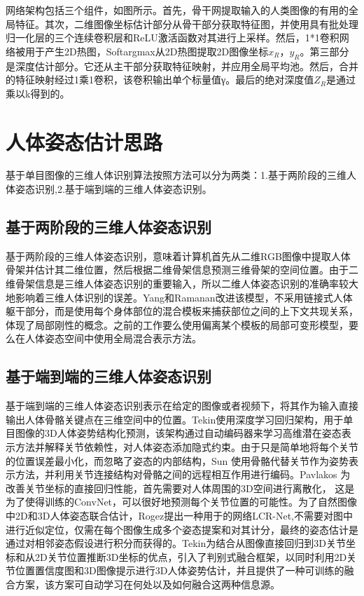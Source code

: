 网络架构包括三个组件，如图所示。首先，骨干网提取输入的人类图像的有用的全局特征。其次，二维图像坐标估计部分从骨干部分获取特征图，并使用具有批处理归一化层的三个连续卷积层和ReLU激活函数对其进行上采样。然后，1*1卷积网络被用于产生2D热图，Softargmax从2D热图提取2D图像坐标$x_R，y_R$。第三部分是深度估计部分。它还从主干部分获取特征映射，并应用全局平均池。然后，合并的特征映射经过1乘1卷积，该卷积输出单个标量值γ。最后的绝对深度值$Z_R$是通过乘以k得到的。

\section{人体姿态估计思路}

基于单目图像的三维人体识别算法按照方法可以分为两类：1.基于两阶段的三维人体姿态识别,2.基于端到端的三维人体姿态识别。

\subsection{基于两阶段的三维人体姿态识别}

基于两阶段的三维人体姿态识别，意味着计算机首先从二维RGB图像中提取人体骨架并估计其二维位置，然后根据二维骨架信息预测三维骨架的空间位置。由于二维骨架信息是三维人体姿态识别的重要输入，所以二维人体姿态识别的准确率较大地影响着三维人体识别的误差。Yang和Ramanan改进该模型，不采用链接式人体躯干部分，而是使用每个身体部位的混合模板来捕获部位之间的上下文共现关系，体现了局部刚性的概念。之前的工作要么使用偏离某个模板的局部可变形模型，要么在人体姿态空间中使用全局混合表示方法。

\subsection{基于端到端的三维人体姿态识别}

基于端到端的三维人体姿态识别表示在给定的图像或者视频下，将其作为输入直接输出人体骨骼关键点在三维空间中的位置。Tekin使用深度学习回归架构，用于单目图像的3D人体姿势结构化预测，该架构通过自动编码器来学习高维潜在姿态表示方法并解释关节依赖性，对人体姿态添加隐式约束。由于只是简单地将每个关节的位置误差最小化，而忽略了姿态的内部结构，Sun 使用骨骼代替关节作为姿势表示方法，并利用关节连接结构对骨骼之间的远程相互作用进行编码。Pavlakos 为改善关节坐标的直接回归性能，首先需要对人体周围的3D空间进行离散化，
这是为了使得训练的ConvNet，可以很好地预测每个关节位置的可能性。为了自然图像中2D和3D人体姿态联合估计，Rogez提出一种用于的网络LCR-Net,不需要对图中进行近似定位，仅需在每个图像生成多个姿态提案和对其计分，最终的姿态估计是通过对相邻姿态假设进行积分而获得的。Tekin为结合从图像直接回归到3D关节坐标和从2D关节位置推断3D坐标的优点，引入了判别式融合框架，以同时利用2D关节位置置信度图和3D图像提示进行3D人体姿势估计，并且提供了一种可训练的融合方案，该方案可自动学习在何处以及如何融合这两种信息源。

